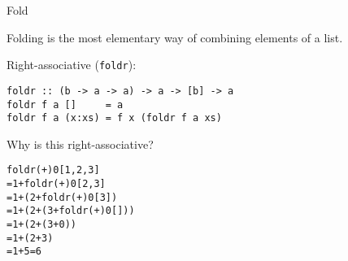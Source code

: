 \documentclass{beamer}
\def\code#1{\texttt{\frenchspacing#1}}
\begin{document}
\begin{frame}[fragile]{Fold}

\begin{block}{\centering Folding is the most elementary way of combining elements of a list.}
\end{block}

Right-associative (\code{foldr}):

\begin{verbatim}
foldr :: (b -> a -> a) -> a -> [b] -> a
foldr f a []     = a
foldr f a (x:xs) = f x (foldr f a xs)
\end{verbatim}

\pause

Why is this right-associative?

\pause

\begin{alltt}
foldr (+) 0 [1,2,3]\pause
= 1 + foldr (+) 0 [2,3]\pause
= 1 + (2 + foldr (+) 0 [3])\pause
= 1 + (2 + (3 + foldr (+) 0 []))\pause
= 1 + (2 + (3 + 0))\pause
= 1 + (2 + 3)\pause
= 1 + 5 = 6
\end{alltt}

\end{frame}
\end{document}
